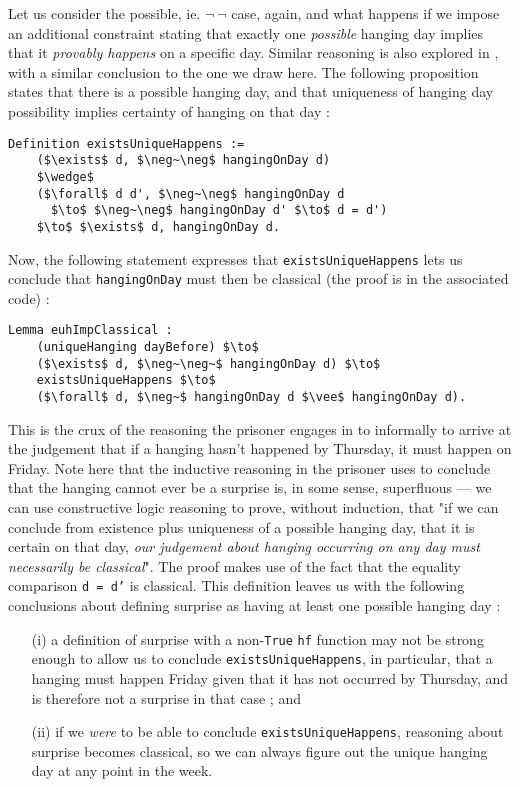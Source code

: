 \documentclass[runningheads]{llncs}
\begin{document}
Let us consider the possible, ie. $\neg~\neg$ case, again, and
what happens if we impose an additional constraint stating that
exactly one \emph{possible} hanging
day implies that it \emph{provably happens} on a specific day. Similar reasoning is also explored in
\cite{fourpossible}, with a similar conclusion to the one we draw here. The following
proposition states that there is a possible hanging day, and that uniqueness of hanging day
possibility implies certainty of hanging on that day :

\begin{lstlisting}[mathescape=true]
  Definition existsUniqueHappens :=
    ($\exists$ d, $\neg~\neg$ hangingOnDay d)
    $\wedge$
    ($\forall$ d d', $\neg~\neg$ hangingOnDay d
      $\to$ $\neg~\neg$ hangingOnDay d' $\to$ d = d')
    $\to$ $\exists$ d, hangingOnDay d.
\end{lstlisting}

Now, the following statement expresses that {\tt existsUniqueHappens} lets us
conclude that {\tt hangingOnDay} must then be classical (the proof is in the
associated code) :

\begin{lstlisting}[mathescape=true]
  Lemma euhImpClassical :
    (uniqueHanging dayBefore) $\to$
    ($\exists$ d, $\neg~\neg~$ hangingOnDay d) $\to$
    existsUniqueHappens $\to$
    ($\forall$ d, $\neg~$ hangingOnDay d $\vee$ hangingOnDay d).
\end{lstlisting}

This is the crux of the reasoning the prisoner
engages in to informally to arrive at the judgement that
if a hanging hasn't happened by Thursday, it must happen on Friday.
Note here that the inductive reasoning in the prisoner uses to conclude that the
hanging cannot ever be a surprise is, in some sense, superfluous --- we can use
constructive logic reasoning to prove, without induction, that "if we can conclude
from existence plus uniqueness of a possible hanging day, that it is certain on that day,
\emph{our judgement about hanging occurring on any day must necessarily be classical}".
The proof makes use of the fact that the equality comparison {\tt d = d'} is
classical. This definition leaves us with the following conclusions about defining surprise as
having at least one possible hanging day :

\begin{itemize}
  \item[(i)] a definition of surprise with a non-{\tt True} {\tt hf} function
  may not be strong enough to allow us to conclude
  {\tt existsUniqueHappens}, in particular, that a hanging
  must happen Friday given that it has not occurred by Thursday, and is
  therefore not a surprise in that case ; and \newline
  \item[(ii)] if we \emph{were} to be able to conclude {\tt existsUniqueHappens},
  reasoning about surprise
  becomes classical, so we can always figure out the unique hanging day at any point in the week.
\end{itemize}
\end{document}
